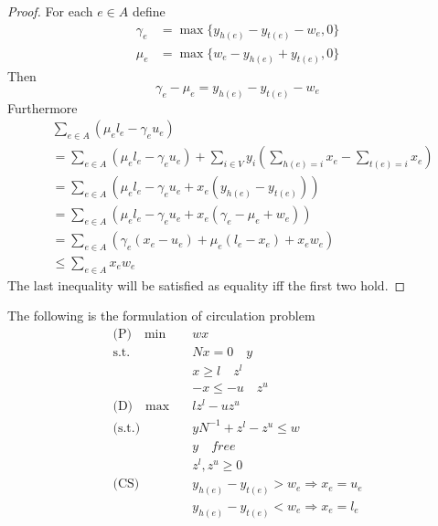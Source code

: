             \begin{proof}
                For each $e \in A$ define
                \begin{align}
                    \gamma_e &= \max\{y_{h(e)} - y_{t(e)} - w_e, 0\} \\
                    \mu_e &= \max\{w_e - y_{h(e)} + y_{t(e)}, 0\}
                \end{align}
                Then
                \begin{equation}
                    \gamma_e - \mu_e = y_{h(e)} - y_{t(e)} - w_e
                \end{equation}
                Furthermore
                \begin{align}
                    &\sum_{e\in A} (\mu_el_e - \gamma_eu_e) \\
                    &= \sum_{e\in A} (\mu_el_e - \gamma_eu_e) + \sum_{i \in V}y_i(\sum_{h(e) = i} x_e - \sum_{t(e) = i} x_e)\\
                    &= \sum_{e\in A} (\mu_el_e - \gamma_eu_e + x_e(y_{h(e)} - y_{t(e)}))\\
                    &= \sum_{e\in A} (\mu_el_e - \gamma_eu_e + x_e(\gamma_e - \mu_e + w_e))\\
                    &= \sum_{e\in A} (\gamma_e(x_e - u_e) + \mu_e(l_e - x_e) + x_ew_e)\\
                    &\le \sum_{e\in A} x_ew_e 
                \end{align}
                The last inequality will be satisfied as equality iff the first two hold.
            \end{proof}

            The following is the formulation of circulation problem
            \begin{align}
                \text{(P)} \quad \min \quad & wx\\
                \text{s.t.} \quad & Nx = 0 \quad y \\
                                  & x \ge l \quad z^l \\
                                  & -x \le -u \quad z^u\\
                \text{(D)} \quad \max \quad & lz^l - uz^u \\
                \text{(s.t.)} \quad & yN^{-1} + z^l-z^u \le w\\
                                    & y \quad free\\
                                    &z^l, z^u \ge 0 \\
                \text{(CS)} \quad & y_{h(e)} - y_{t(e)} > w_e \Rightarrow x_e = u_e\\
                                  & y_{h(e)} - y_{t(e)} < w_e \Rightarrow x_e = l_e
            \end{align}

